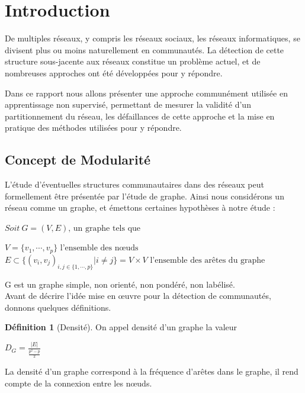 \documentclass[frenchb]{report}
\newcommand{\1}{\mathbbm{1}}
\theoremstyle{definition}\newtheorem{defn}{Définition}
\theoremstyle{definition}\newtheorem{exm}{Exemple}
\theoremstyle{definition}\newtheorem{nota}{Notation}
\theoremstyle{definition}\newtheorem{rem}{Remarque}
\begin{document}
\chapter*{Introduction}

De multiples réseaux, y compris les réseaux sociaux, les réseaux informatiques, se divisent plus ou moins naturellement en communautés. La détection de cette structure sous-jacente aux réseaux constitue un problème actuel, et de nombreuses approches ont été développées pour y répondre. 

Dans ce rapport nous allons présenter une approche communément utilisée en apprentissage non supervisé, permettant de mesurer la validité d'un partitionnement du réseau, les défaillances de cette approche et la mise en pratique des méthodes utilisées pour y répondre. 

\section*{Concept de Modularité}
L'étude d'éventuelles structures communautaires dans des réseaux peut formellement être présentée par l'étude de graphe. Ainsi nous considérons un réseau comme un graphe, et émettons certaines hypothèses à notre étude : 

\begin{center}
$Soit~G = (V,E)\text{, un graphe tels que }$
\end{center}
$V = \{v_1, \cdots, v_p\} \text{ l'ensemble des nœuds }$\newline
$E \subset{\{ (v_i,v_j)_{i,j \in \{1,\cdots,p\}}| i \neq j \}} = V\times V \text{ l'ensemble des arêtes du graphe}$\

G est un graphe simple, non orienté, non pondéré, non labélisé.\\

Avant de décrire l'idée mise en œuvre pour la détection de communautés, donnons quelques définitions.\\

\begin{defn}[Densité]
On appel densité d'un graphe la valeur 
\begin{center}
$D_G = \frac{|E|}{\frac{p^2-p}{2}} $
\end{center}
\end{defn}

La densité d'un graphe correspond à la fréquence d'arêtes dans le graphe, il rend compte de la connexion entre les nœuds.
\end{document}

